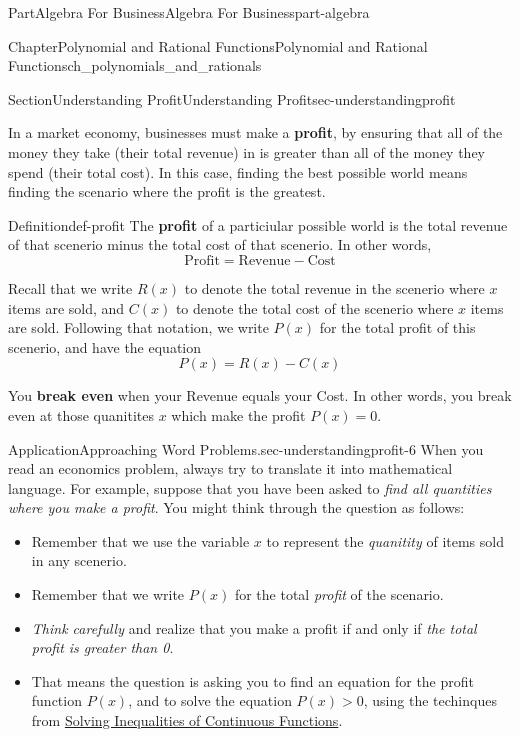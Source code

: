 \documentclass[oneside,10pt,]{tufte-book}
\newcommand{\terminology}[1]{\textbf{#1}}
\numberwithin{equation}{chapter}
\newcommand{\gt}{>}
\begin{document}
\begin{partptx}{Part}{Algebra For Business}{}{Algebra For Business}{}{}{part-algebra}
\begin{chapterptx}{Chapter}{Polynomial and Rational Functions}{}{Polynomial and Rational Functions}{}{}{ch_polynomials_and_rationals}
\begin{sectionptx}{Section}{Understanding Profit}{}{Understanding Profit}{}{}{sec-understandingprofit}
\par
In a market economy, businesses must make a \terminology{profit}, by ensuring that all of the money they take (their total revenue) in is greater than all of the money they spend (their total cost).  In this case, finding the best possible world means finding the scenario where the profit is the greatest.%
\begin{definition}{Definition}{}{def-profit}%
The \terminology{profit} of a particiular possible world is the total revenue of that scenerio minus the total cost of that scenerio.  In other words,%
\begin{equation*}
\text{Profit} = \text{Revenue} - \text{Cost}
\end{equation*}
%
\par
Recall that we write \(R(x)\) to denote the total revenue in the scenerio where \(x\) items are sold, and \(C(x)\) to denote the total cost of the scenerio where \(x\) items are sold.  Following that notation, we write \(P(x)\) for the total profit of this scenerio, and have the equation%
\begin{equation*}
P(x) = R(x) - C(x)
\end{equation*}
%
\par
You \terminology{break even} when your Revenue equals your Cost.  In other words, you break even at those quanitites \(x\) which make the profit \(P(x)=0\).%
\end{definition}
\begin{insight}{Application}{Approaching Word Problems.}{sec-understandingprofit-6}%
When you read an economics problem, always try to translate it into mathematical language.  For example, suppose that you have been asked to \emph{find all quantities where you make a profit}. You might think through the question as follows:%
\begin{itemize}[label=\textbullet]
\item{}Remember that we use the variable \(x\) to represent the \emph{quanitity} of items sold in any scenerio.%
\item{}Remember that we write \(P(x)\) for the total \emph{profit} of the scenario.%
\item{}\emph{Think carefully} and realize that you make a profit if and only if \emph{the total profit is greater than 0}.%
\item{}That means the question is asking you to find an equation for the profit function \(P(x)\), and to solve the equation \(P(x)\gt 0\), using the techinques from \hyperref[assemblage-continuous-inequalities]{Solving Inequalities of Continuous Functions}.%

\end{itemize}
\end{insight}
\end{sectionptx}
\end{chapterptx}
\end{partptx}
\end{document}
